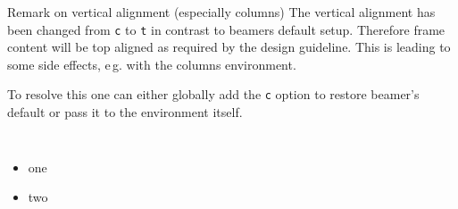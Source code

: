\documentclass[
    english,
    accentcolor=9c,
    logofile=hulogo.pdf,
]{tudabeamer}
\newcommand*{\code}[1]{\texttt{#1}}
\begin{document}
\begin{frame}{Remark on vertical alignment (especially columns)}
    The vertical alignment has been changed from \code{c} to \code{t} in contrast to beamers default setup.
    Therefore frame content will be top aligned as required by the design guideline.
    This is leading to some side effects,  e\,g. with the columns environment.

    To resolve this one can either globally add the \code{c} option to restore beamer's default or pass it to the environment itself.

    \begin{columns}[onlytextwidth,c]
        \begin{itemize}
            \item one
            \item two
        \end{itemize}
    \end{columns}
\end{frame}
\end{document}
